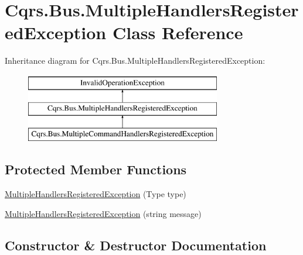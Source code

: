 \hypertarget{classCqrs_1_1Bus_1_1MultipleHandlersRegisteredException}{}\section{Cqrs.\+Bus.\+Multiple\+Handlers\+Registered\+Exception Class Reference}
\label{classCqrs_1_1Bus_1_1MultipleHandlersRegisteredException}
Inheritance diagram for Cqrs.\+Bus.\+Multiple\+Handlers\+Registered\+Exception\+:\begin{figure}[H]
\begin{center}
\leavevmode
\includegraphics[height=3.000000cm]{classCqrs_1_1Bus_1_1MultipleHandlersRegisteredException}
\end{center}
\end{figure}
\subsection*{Protected Member Functions}
\begin{DoxyCompactItemize}
\item 
\hyperlink{classCqrs_1_1Bus_1_1MultipleHandlersRegisteredException_abdd28d6ed537ada1d0cb0133e366c431}{Multiple\+Handlers\+Registered\+Exception} (Type type)
\item 
\hyperlink{classCqrs_1_1Bus_1_1MultipleHandlersRegisteredException_ab6bb75aa5785b323f376b25b0b8d4713}{Multiple\+Handlers\+Registered\+Exception} (string message)
\end{DoxyCompactItemize}


\subsection{Constructor \& Destructor Documentation}
\mbox{\label{classCqrs_1_1Bus_1_1MultipleHandlersRegisteredException_abdd28d6ed537ada1d0cb0133e366c431}} 
